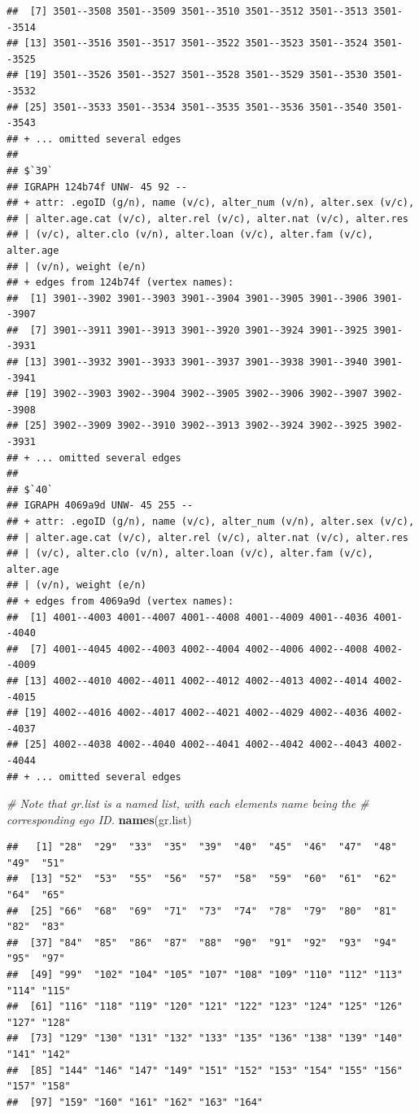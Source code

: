 \documentclass[
]{book}
\newenvironment{Shaded}{\begin{snugshade}}{\end{snugshade}}
\newcommand{\CommentTok}[1]{\textcolor[rgb]{0.56,0.35,0.01}{\textit{#1}}}
\newcommand{\FunctionTok}[1]{\textcolor[rgb]{0.13,0.29,0.53}{\textbf{#1}}}
\newcommand{\NormalTok}[1]{#1}
\begin{document}
\begin{verbatim}
##  [7] 3501--3508 3501--3509 3501--3510 3501--3512 3501--3513 3501--3514
## [13] 3501--3516 3501--3517 3501--3522 3501--3523 3501--3524 3501--3525
## [19] 3501--3526 3501--3527 3501--3528 3501--3529 3501--3530 3501--3532
## [25] 3501--3533 3501--3534 3501--3535 3501--3536 3501--3540 3501--3543
## + ... omitted several edges
## 
## $`39`
## IGRAPH 124b74f UNW- 45 92 -- 
## + attr: .egoID (g/n), name (v/c), alter_num (v/n), alter.sex (v/c),
## | alter.age.cat (v/c), alter.rel (v/c), alter.nat (v/c), alter.res
## | (v/c), alter.clo (v/n), alter.loan (v/c), alter.fam (v/c), alter.age
## | (v/n), weight (e/n)
## + edges from 124b74f (vertex names):
##  [1] 3901--3902 3901--3903 3901--3904 3901--3905 3901--3906 3901--3907
##  [7] 3901--3911 3901--3913 3901--3920 3901--3924 3901--3925 3901--3931
## [13] 3901--3932 3901--3933 3901--3937 3901--3938 3901--3940 3901--3941
## [19] 3902--3903 3902--3904 3902--3905 3902--3906 3902--3907 3902--3908
## [25] 3902--3909 3902--3910 3902--3913 3902--3924 3902--3925 3902--3931
## + ... omitted several edges
## 
## $`40`
## IGRAPH 4069a9d UNW- 45 255 -- 
## + attr: .egoID (g/n), name (v/c), alter_num (v/n), alter.sex (v/c),
## | alter.age.cat (v/c), alter.rel (v/c), alter.nat (v/c), alter.res
## | (v/c), alter.clo (v/n), alter.loan (v/c), alter.fam (v/c), alter.age
## | (v/n), weight (e/n)
## + edges from 4069a9d (vertex names):
##  [1] 4001--4003 4001--4007 4001--4008 4001--4009 4001--4036 4001--4040
##  [7] 4001--4045 4002--4003 4002--4004 4002--4006 4002--4008 4002--4009
## [13] 4002--4010 4002--4011 4002--4012 4002--4013 4002--4014 4002--4015
## [19] 4002--4016 4002--4017 4002--4021 4002--4029 4002--4036 4002--4037
## [25] 4002--4038 4002--4040 4002--4041 4002--4042 4002--4043 4002--4044
## + ... omitted several edges
\end{verbatim}

\begin{Shaded}
\begin{Highlighting}[]
\CommentTok{\# Note that gr.list is a named list, with each element\textquotesingle{}s name being the }
\CommentTok{\# corresponding ego ID.}
\FunctionTok{names}\NormalTok{(gr.list)}
\end{Highlighting}
\end{Shaded}

\begin{verbatim}
##   [1] "28"  "29"  "33"  "35"  "39"  "40"  "45"  "46"  "47"  "48"  "49"  "51" 
##  [13] "52"  "53"  "55"  "56"  "57"  "58"  "59"  "60"  "61"  "62"  "64"  "65" 
##  [25] "66"  "68"  "69"  "71"  "73"  "74"  "78"  "79"  "80"  "81"  "82"  "83" 
##  [37] "84"  "85"  "86"  "87"  "88"  "90"  "91"  "92"  "93"  "94"  "95"  "97" 
##  [49] "99"  "102" "104" "105" "107" "108" "109" "110" "112" "113" "114" "115"
##  [61] "116" "118" "119" "120" "121" "122" "123" "124" "125" "126" "127" "128"
##  [73] "129" "130" "131" "132" "133" "135" "136" "138" "139" "140" "141" "142"
##  [85] "144" "146" "147" "149" "151" "152" "153" "154" "155" "156" "157" "158"
##  [97] "159" "160" "161" "162" "163" "164"
\end{verbatim}
\end{document}
